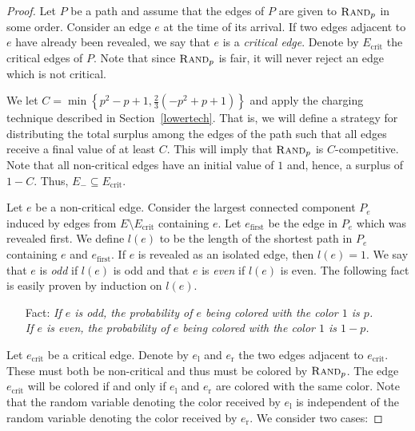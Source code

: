 \documentclass[smallextended]{svjour3}
\newcommand{\Ecrit}{\ensuremath{E_{\text{crit}}}\xspace}
\newcommand{\ecrit}{\ensuremath{e_{\text{crit}}}\xspace}
\newcommand{\RP}{\ensuremath{\operatorname{\textsc{Rand}}}\xspace}
\begin{document}
\begin{proof}
Let $P$ be a path and assume that the edges of $P$ are given to $\RP_p$ in some order.
Consider an edge $e$ at the time of its arrival. If two edges adjacent to $e$ have already been revealed, we say that $e$ is a \emph{critical edge}. Denote by $\Ecrit$ the critical edges of $P$. Note that since $\RP_p$ is fair, it will never reject an edge which is not critical.

We let $C=\min\left\{p^2-p+1, \frac{2}{3}(-p^2+p+1)\right\}$ and apply the charging technique described in Section~\ref{lowertech}. That is, we will define a strategy for distributing the total surplus among the edges of the path such that all edges receive a final value of at least $C$. This will imply that $\RP_p$ is $C$-competitive. Note that all non-critical edges have an initial value of $1$ and, hence, a surplus of $1-C$. Thus, $E_- \subseteq \Ecrit$.

Let $e$ be a non-critical edge. Consider the largest connected component $P_e$ induced by edges from $E\setminus \Ecrit$ containing $e$. Let $e_{\text{first}}$ be the edge in $P_e$ which was revealed first. We define $l(e)$ to be the length of the shortest path in $P_e$ containing $e$ and $e_{\text{first}}$. If $e$ is revealed as an isolated edge, then $l(e)=1$. We say that $e$ is \emph{odd} if $l(e)$ is odd and that $e$ is \emph{even} if $l(e)$ is even.
The following fact is easily proven by induction on $l(e)$. 

\begin{enumerate}[Fact:]
\item[Fact:] {\em If $e$ is odd, the probability of $e$ being colored with the color $1$ is $p$.\\ If $e$ is even, the probability of $e$ being colored with the color $1$ is $1-p$.} 
\end{enumerate}

Let $\ecrit$ be a critical edge. Denote by $e_{\text{l}}$ and $e_{\text{r}}$ the two edges adjacent to $\ecrit$. These must both be non-critical and thus must be colored by $\RP_p$. The edge $\ecrit$ will be colored if and only if $e_{\text{l}}$ and $e_{\text{r}}$ are colored with the same color. Note that the random variable denoting the color received by $e_{\text{l}}$ is independent of the random variable denoting the color received by $e_{\text{r}}$. We consider two cases:


\end{proof}
\end{document}
